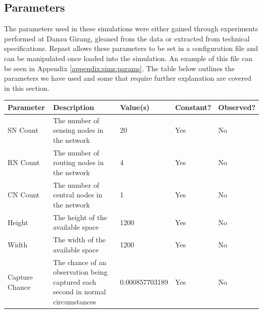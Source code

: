 \subsection{Parameters}
The parameters used in these simulations were either gained through experiments performed at Danau Girang, gleaned from the data or extracted from technical specifications. Repast allows these parameters to be set in a configuration file and can be manipulated once loaded into the simulation. An example of this file can be seen in Appendix \ref{appendix:sims:params}. The table below outlines the parameters we have used and some that require further explanation are covered in this section.
	\begin{landscape}
	\begin{table} 
	\begin{tabularx}{\textwidth}{|p{4cm}|p{10cm}|p{3cm}|p{2cm}|p{2cm}|}
\toprule
	\textbf{Parameter}                      & \textbf{Description}                                                                                                        & \textbf{Value(s)}   & \textbf{Constant?} & \textbf{Observed?} \\
\midrule
	SN Count                      & The number of sensing nodes in the network                                                                                  & 20                  & Yes                & No                 \\
	RN Count                      & The number of routing nodes in the network                                                                                  & 4                   & Yes                & No                 \\
	CN Count                      & The number of central nodes in the network                                                                                  & 1                   & Yes                & No                 \\
	Height                                  & The height of the available space                                                                                           & 1200                & Yes                & No                 \\
	Width                                   & The width of the available space                                                                                            & 1200                & Yes                & No                 \\
	Capture Chance                          & The chance of an observation being captured each second in normal circumstances                                             & 0.000857703189      & Yes                & No                 \\

\end{tabularx}
\end{table}
\end{landscape}
